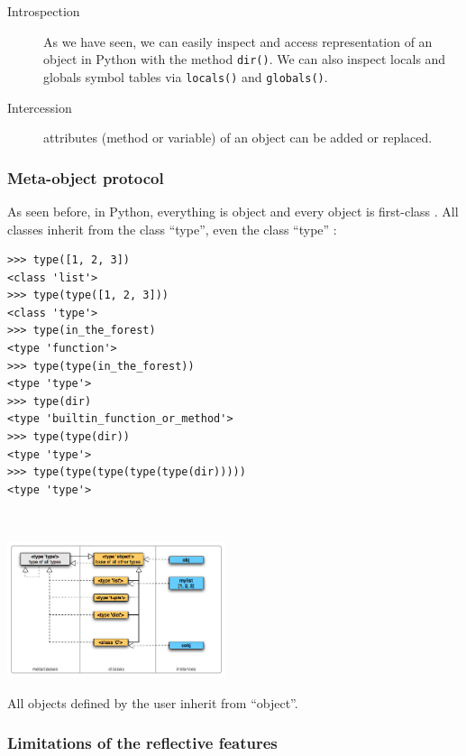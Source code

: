 \documentclass[a4paper,10pt]{article}
\begin{document}
\begin{description}
\item[Introspection] As we have seen, we can easily inspect and access representation of an object in Python with the method \lstinline|dir()|. We can also inspect locals and globals symbol tables via \lstinline|locals()| and \lstinline|globals()|.

\item[Intercession] attributes (method or variable) of an object can be added or replaced.
\end{description}

\subsubsection{Meta-object protocol}

As seen before, in Python, everything is object and every object is first-class \cite{python:first-class}. All classes inherit from the class ``type'', even the class ``type'' \cite{ python:image}:

\begin{minipage}[c]{.48\linewidth}
\begin{lstlisting}
>>> type([1, 2, 3])
<class 'list'>
>>> type(type([1, 2, 3]))
<class 'type'>
>>> type(in_the_forest)
<type 'function'>
>>> type(type(in_the_forest))
<type 'type'>
>>> type(dir)
<type 'builtin_function_or_method'>
>>> type(type(dir))
<type 'type'>
>>> type(type(type(type(type(dir)))))
<type 'type'>
\end{lstlisting}
~\\
\end{minipage} \hfill
\begin{minipage}[c]{.48\linewidth}
\includegraphics[height=4cm]{typesmap.png}
\end{minipage}

All objects defined by the user inherit from ``object''.

\subsubsection{Limitations of the reflective features}
\end{document}
